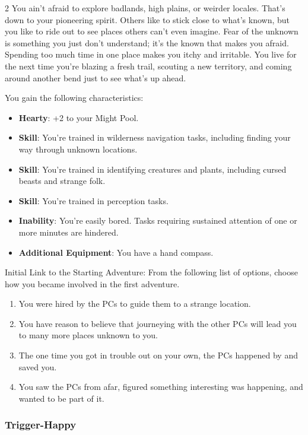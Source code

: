 \begin{multicols}{2}
You ain’t afraid to explore badlands, high plains, or weirder locales. That’s down to your pioneering spirit. Others like to stick close to what’s known, but you like to ride out to see places others can’t even imagine. Fear of the unknown is something you just don’t understand; it’s the known that makes you afraid. Spending too much time in one place makes you itchy and irritable. You live for the next time you’re blazing a fresh trail, scouting a new territory, and coming around another bend just to see what’s up ahead.

You gain the following characteristics: 
\begin{itemize}
\item \textbf{Hearty}: +2 to your Might Pool. 
\item \textbf{Skill}: You’re trained in wilderness navigation tasks, including finding your way through unknown locations. 
\item \textbf{Skill}: You’re trained in identifying creatures and plants, including cursed beasts and strange folk. 
\item \textbf{Skill}: You’re trained in perception tasks. 
\item \textbf{Inability}: You’re easily bored. Tasks requiring sustained attention of one or more minutes are hindered. 
\item \textbf{Additional Equipment}: You have a hand compass.
\end{itemize}

Initial Link to the Starting Adventure: From the following list of options, choose how you became involved in the first adventure. 
\begin{enumerate}
\item You were hired by the PCs to guide them to a strange location. 
\item You have reason to believe that journeying with the other PCs will lead you to many more places unknown to you. 
\item The one time you got in trouble out on your own, the PCs happened by and saved you. 
\item You saw the PCs from afar, figured something interesting was happening, and wanted to be part of it.
\end{enumerate}

\subsubsection{Trigger-Happy}


\end{multicols}
